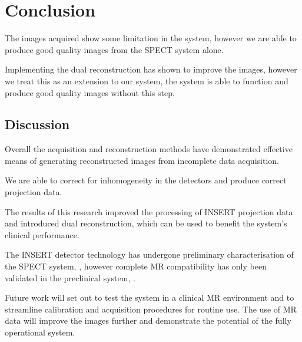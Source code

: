 \section{Conclusion}


The images acquired show some limitation in the system, however we are able to produce good quality images from the SPECT system alone.

Implementing the dual reconstruction has shown to improve the images, however we treat this as an extension to our system, the system is able to function and produce good quality images without this step.

\subsection{Discussion}

Overall the acquisition and reconstruction methods have demonstrated effective means of generating reconstructed images from incomplete data acquisition. 

We are able to correct for inhomogeneity in the detectors and produce correct projection data.

The results of this research improved the processing of INSERT projection data and introduced dual reconstruction, which can be used to benefit the system's clinical performance.

The INSERT detector technology has undergone preliminary characterisation of the SPECT system, \cite{8891783}, however complete MR compatibility has only been validated in the preclinical system, \cite{8612977}. 

Future work will set out to test the system in a clinical MR environment and to streamline calibration and acquisition procedures for routine use. The use of MR data will improve the images further and demonstrate the potential of the fully operational system.   

